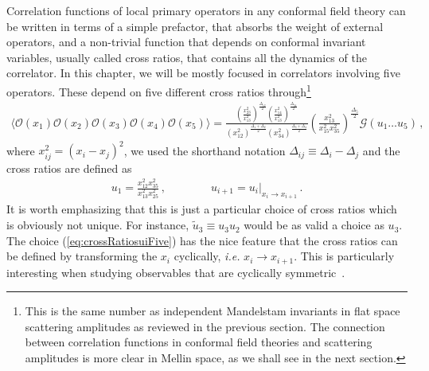 Correlation functions of local primary operators in any conformal field theory can be written in terms of a simple prefactor, that absorbs the weight of external operators, and a  non-trivial function that depends on conformal invariant variables, usually called cross ratios, that contains all the dynamics of the correlator.
In this chapter, we will be mostly focused in correlators involving five operators.
These depend on five different cross ratios through\footnote{This is the same number as independent Mandelstam invariants in flat space scattering amplitudes as reviewed in the previous section. The connection between correlation functions in conformal field theories and scattering amplitudes is more clear in Mellin space, as we shall see in the next section. }
\begin{align}
  \langle \mathcal{O}(x_1) \mathcal{O}(x_2) \mathcal{O}(x_3) \mathcal{O}(x_4) \mathcal{O}(x_5)  \rangle  = \frac{\left(\frac{x_{23}^2}{x_{13}^2}\right)^{\frac{\Delta_{12}}{2}} \left(\frac{x_{14}^2}{x_{13}^2}\right)^{\frac{\Delta_{34}}{2}}   }{(x_{12}^2)^{\frac{\Delta_1+\Delta_2}{2}}(x_{34}^2)^{\frac{\Delta_3+\Delta_4}{2}}} \left(\frac{x_{13}^2}{x_{15}^2x_{35}^2}\right)^{\frac{\Delta_5}{2}}\mathcal{G}(u_1\dots u_5)\,,
  \label{eq:fiveptcorrelatordef}
\end{align}
where $x_{ij}^2=(x_i-x_j)^2$, we used the shorthand notation $\Delta_{ij}\equiv \Delta_i-\Delta_j$ and the cross ratios are defined as
\begin{align}
  u_1= \frac{x_{12}^{2} x_{35}^{2}}{x_{13}^{2} x_{25}^{2}}\,,  \qquad\qquad u_{i+1} = u_{i}|_{x_{i} \rightarrow x_{i+1}}\,.
  \label{eq:crossRatiosuiFive}
\end{align}
It is worth emphasizing that this is just a particular choice of cross ratios which is obviously not unique.
For instance, $\tilde{u}_3\equiv u_3u_2$ would be as valid a choice as $u_3$.
The choice (\ref{eq:crossRatiosuiFive}) has the nice feature that the cross ratios can be defined by transforming the $x_i$ cyclically, {\em i.e.} $x_{i}\rightarrow x_{i+1}$.
This is particularly interesting when studying observables that are cyclically symmetric~\cite{Bercini:2020msp,Bercini:2021jti,Antunes:2021kmm}.

